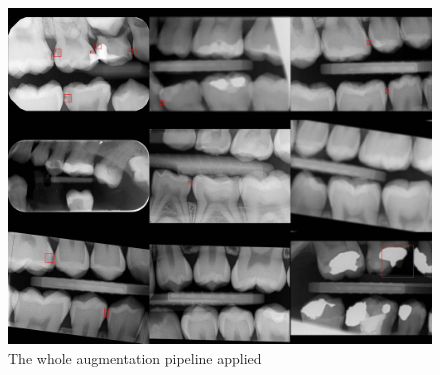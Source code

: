 \begin{figure}
    \includegraphics[width =0.9\linewidth]{images/all_transf.jpg}
    \caption{The whole augmentation pipeline applied}
\end{figure}
